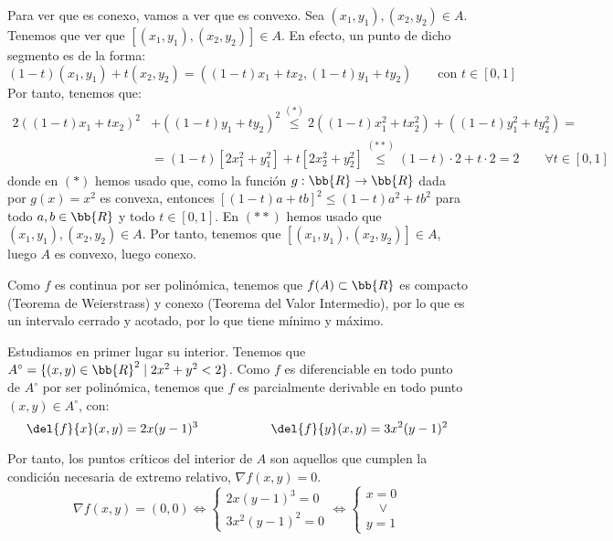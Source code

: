 \begin{ejercicio}
    Para ver que es conexo, vamos a ver que es convexo. Sea $(x_1,y_1), (x_2,y_2)\in A$. Tenemos que ver que $[(x_1,y_1), (x_2,y_2)]\in A$.
    En efecto, un punto de dicho segmento es de la forma:
    \begin{equation*}
        (1-t)(x_1,y_1)+t(x_2,y_2) = ((1-t)x_1+tx_2, (1-t)y_1+ty_2) \qquad \text{con } t\in [0,1]
    \end{equation*}
    Por tanto, tenemos que:
    \begin{equation*}
        \begin{split}
            2((1-t)x_1+tx_2)^2 &+ ((1-t)y_1+ty_2)^2
            \stackrel{(\ast)}{\leq}
            2((1-t)x_1^2+tx_2^2) + ((1-t)y_1^2+ty_2^2)
            =\\&= (1-t)[2x_1^2+y_1^2] + t[2x_2^2+y_2^2]
            \stackrel{(\ast\ast)}{\leq} (1-t)\cdot 2 + t\cdot 2 = 2
            \qquad \forall t\in [0,1]
        \end{split}
    \end{equation*}
    donde en $(\ast)$ hemos usado que, como la función
    $g:\bb{R}\to \bb{R}$ dada por $g(x)=x^2$ es convexa, entonces
    $[(1-t)a + tb]^2 \leq (1-t)a^2 + tb^2$ para todo $a,b\in \bb{R}$ y todo $t\in [0,1]$.
    En $(\ast\ast)$ hemos usado que $(x_1,y_1), (x_2,y_2)\in A$.
    Por tanto, tenemos que $[(x_1,y_1), (x_2,y_2)]\in A$, luego $A$ es convexo, luego conexo.

    Como $f$ es continua por ser polinómica, tenemos que $f(A)\subset \bb{R}$ es compacto (Teorema de Weierstrass) y conexo (Teorema del Valor Intermedio), por lo que es un intervalo cerrado y acotado, por lo que tiene mínimo y máximo.

    Estudiamos en primer lugar su interior. Tenemos que $A^\circ = \{(x,y)\in \bb{R}^2\mid 2x^2+y^2< 2\}$. Como $f$ es diferenciable en todo punto de $A^\circ$ por ser polinómica, tenemos que $f$ es parcialmente derivable en todo punto $(x,y)\in A^\circ$, con:
    \begin{equation*}
        \del{f}{x}(x,y) = 2x(y-1)^3 \hspace{2cm}
        \del{f}{y}(x,y) = 3x^2(y-1)^2
    \end{equation*}

    Por tanto, los puntos críticos del interior de $A$ son aquellos que cumplen la condición necesaria de extremo relativo, $\nabla f(x,y)=0$.
    \begin{equation*}
        \nabla f(x,y) = (0,0) \Longleftrightarrow
        \begin{cases}
            2x(y-1)^3 = 0 \\
            3x^2(y-1)^2 = 0
        \end{cases}
        \Longleftrightarrow
        \begin{cases}
            x=0 \\
            \quad \lor \\
            y=1
        \end{cases}
    \end{equation*}


\end{ejercicio}
